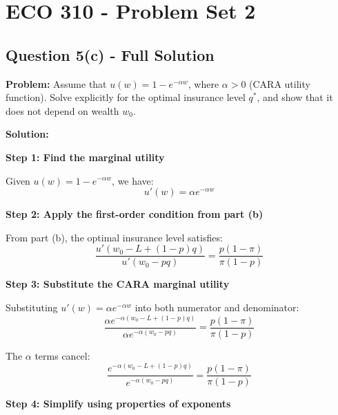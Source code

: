 \documentclass[12pt]{article}
\begin{document}
\section*{ECO 310 - Problem Set 2}
\subsection*{Question 5(c) - Full Solution}

\textbf{Problem:} Assume that $u(w) = 1 - e^{-\alpha w}$, where $\alpha > 0$ (CARA utility function). Solve explicitly for the optimal insurance level $q^*$, and show that it does not depend on wealth $w_0$.

\vspace{0.5cm}

\textbf{Solution:}

\textbf{Step 1: Find the marginal utility}

Given $u(w) = 1 - e^{-\alpha w}$, we have:
\begin{equation}
u'(w) = \alpha e^{-\alpha w}
\end{equation}

\vspace{0.3cm}

\textbf{Step 2: Apply the first-order condition from part (b)}

From part (b), the optimal insurance level satisfies:
\begin{equation}
\frac{u'(w_0 - L + (1-p)q)}{u'(w_0 - pq)} = \frac{p(1-\pi)}{\pi(1-p)}
\end{equation}

\vspace{0.3cm}

\textbf{Step 3: Substitute the CARA marginal utility}

Substituting $u'(w) = \alpha e^{-\alpha w}$ into both numerator and denominator:
\begin{equation}
\frac{\alpha e^{-\alpha(w_0 - L + (1-p)q)}}{\alpha e^{-\alpha(w_0 - pq)}} = \frac{p(1-\pi)}{\pi(1-p)}
\end{equation}

The $\alpha$ terms cancel:
\begin{equation}
\frac{e^{-\alpha(w_0 - L + (1-p)q)}}{e^{-\alpha(w_0 - pq)}} = \frac{p(1-\pi)}{\pi(1-p)}
\end{equation}

\vspace{0.3cm}

\textbf{Step 4: Simplify using properties of exponents}
\end{document}
